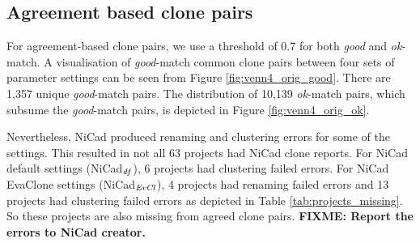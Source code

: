 \documentclass{sig-alternate-05-2015}
\newcommand\FIXME[1]{\textbf{FIXME: #1}}
\begin{document}
\subsection{Agreement based clone pairs}
For agreement-based clone pairs, we use a threshold of 0.7 for both \textit{good} and \textit{ok}-match. A visualisation of \textit{good}-match common clone pairs between four sets of parameter settings can be seen from Figure \ref{fig:venn4_orig_good}. There are 1,357 unique \textit{good}-match pairs. The distribution of 10,139 \textit{ok}-match pairs, which subsume the \textit{good}-match pairs, is depicted in Figure \ref{fig:venn4_orig_ok}.

Nevertheless,  NiCad produced renaming and clustering errors for some of the settings. This resulted in not all 63 projects had NiCad clone reports. For NiCad default settings (NiCad$_{\textrm{\textit{df}}}$), 6 projects had clustering failed errors. For NiCad EvaClone settings (NiCad$_{\textrm{\textit{EvCl}}}$), 4 projects had renaming failed errors and 13 projects had clustering failed errors as depicted in Table \ref{tab:projects_missing}. So these projects are also missing from agreed clone pairs. \FIXME{Report the errors to NiCad creator.}

\end{document}
